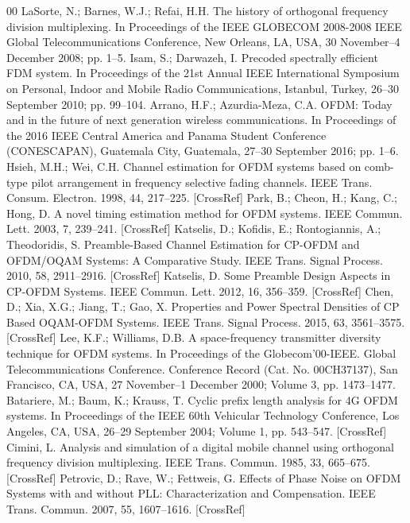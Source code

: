 \documentclass[conference]{IEEEtran}
\begin{document}
\begin{thebibliography}{00}
 LaSorte, N.; Barnes, W.J.; Refai, H.H. The history of orthogonal frequency division multiplexing. In Proceedings of the IEEE GLOBECOM 2008-2008 IEEE Global Telecommunications Conference, New Orleans, LA, USA, 30 November–4 December 2008; pp. 1–5.
 Isam, S.; Darwazeh, I. Precoded spectrally efficient FDM system. In Proceedings of the 21st Annual IEEE International Symposium on Personal, Indoor and Mobile Radio Communications, Istanbul, Turkey, 26–30 September 2010; pp. 99–104.
 Arrano, H.F.; Azurdia-Meza, C.A. OFDM: Today and in the future of next generation wireless communications. In Proceedings of the 2016 IEEE Central America and Panama Student Conference (CONESCAPAN), Guatemala City, Guatemala, 27–30 September 2016; pp. 1–6.
 Hsieh, M.H.; Wei, C.H. Channel estimation for OFDM systems based on comb-type pilot arrangement in frequency selective fading channels. IEEE Trans. Consum. Electron. 1998, 44, 217–225. [CrossRef]
 Park, B.; Cheon, H.; Kang, C.; Hong, D. A novel timing estimation method for OFDM systems. IEEE Commun. Lett. 2003, 7, 239–241. [CrossRef]
 Katselis, D.; Kofidis, E.; Rontogiannis, A.; Theodoridis, S. Preamble-Based Channel Estimation for CP-OFDM and OFDM/OQAM Systems: A Comparative Study. IEEE Trans. Signal Process. 2010, 58, 2911–2916. [CrossRef]
 Katselis, D. Some Preamble Design Aspects in CP-OFDM Systems. IEEE Commun. Lett. 2012, 16, 356–359. [CrossRef]
 Chen, D.; Xia, X.G.; Jiang, T.; Gao, X. Properties and Power Spectral Densities of CP Based OQAM-OFDM Systems. IEEE Trans. Signal Process. 2015, 63, 3561–3575. [CrossRef]
 Lee, K.F.; Williams, D.B. A space-frequency transmitter diversity technique for OFDM systems. In Proceedings of the Globecom’00-IEEE. Global Telecommunications Conference. Conference Record (Cat. No. 00CH37137), San Francisco, CA, USA, 27 November–1 December 2000; Volume 3, pp. 1473–1477.
 Batariere, M.; Baum, K.; Krauss, T. Cyclic prefix length analysis for 4G OFDM systems. In Proceedings of the IEEE 60th Vehicular Technology Conference, Los Angeles, CA, USA, 26–29 September 2004; Volume 1, pp. 543–547. [CrossRef]
 Cimini, L. Analysis and simulation of a digital mobile channel using orthogonal frequency division multiplexing. IEEE Trans. Commun. 1985, 33, 665–675. [CrossRef]
 Petrovic, D.; Rave, W.; Fettweis, G. Effects of Phase Noise on OFDM Systems with and without PLL: Characterization and Compensation. IEEE Trans. Commun. 2007, 55, 1607–1616. [CrossRef]

\end{thebibliography}
\end{document}
